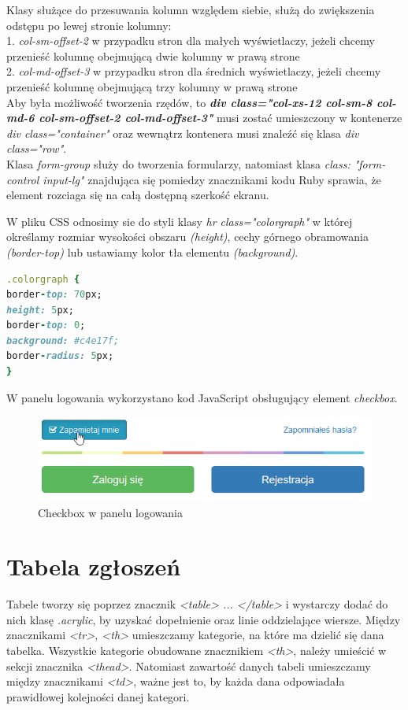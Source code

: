 \documentclass[openright]{xmgr}
\begin{document}
Klasy służące do przesuwania kolumn względem siebie, służą do zwiększenia odstępu po lewej stronie kolumny: \\
1. \textit{col-sm-offset-2} w przypadku stron dla małych wyświetlaczy, jeżeli chcemy przenieść kolumnę obejmującą dwie kolumny w prawą strone\\
2. \textit{col-md-offset-3} w przypadku stron dla średnich wyświetlaczy, jeżeli chcemy przenieść kolumnę obejmującą trzy kolumny w prawą strone\\
\newpage
Aby była możliwość tworzenia rzędów, to \textbf{\textit{div class="col-xs-12 col-sm-8 col-md-6 col-sm-offset-2 col-md-offset-3"}} musi zostać umieszczony w kontenerze \textit{div class="container"} oraz wewnątrz kontenera musi znaleźć się klasa \textit{div class="row"}.\\

Klasa \textit{form-group} służy do tworzenia formularzy, natomiast klasa \textit{class: "form-control input-lg"} znajdująca się pomiedzy znacznikami kodu Ruby sprawia, że element rozciaga się na całą dostępną szerkość ekranu.

W pliku CSS odnosimy sie do styli klasy  \textit{hr class="colorgraph"} w której określamy rozmiar wysokości obszaru \textit{(height)}, cechy górnego obramowania \textit{(border-top)} lub ustawiamy kolor tła elementu \textit{(background)}.
\begin{lstlisting}[language=Ruby,lineskip={-1pt},caption=Kod CSS dla panelu logowania]
.colorgraph {
border-top: 70px;
height: 5px;
border-top: 0;
background: #c4e17f;
border-radius: 5px;
}
\end{lstlisting}

W panelu logowania wykorzystano kod JavaScript obsługujący element \textit{checkbox}.\\

\begin{figure}[!tbh]
	\centering
	\includegraphics[width=\linewidth]{image/checkbox}
	\caption{Checkbox w panelu logowania}
\end{figure}	
	
	\section{Tabela zgłoszeń}
	Tabele tworzy się poprzez znacznik \textit{<table> ... </table>} i wystarczy dodać do nich klasę \textit{.acrylic}, by uzyskać dopełnienie oraz linie oddzielające wiersze. Między znacznikami \textit{<tr>, <th>} umieszczamy kategorie, na które ma dzielić się dana tabelka. Wszystkie kategorie obudowane znacznikiem \textit{<th>}, należy umieścić w sekcji znacznika \textit{<thead>}. Natomiast zawartość danych tabeli umieszczamy między znacznikami \textit{<td>}, ważne jest to, by każda dana odpowiadała prawidłowej kolejności danej kategori.
	
\end{document}
